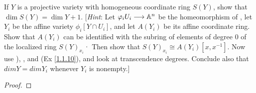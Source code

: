 \label{1.2.6}

If $Y$ is a projective variety with homogeneous coordinate ring $S(Y)$, show that
$\dim S(Y) = \dim Y + 1$. [\textit{Hint}: Let $\varphi_i U_i \longrightarrow \mathbb A^n$ be the homeomorphism of \cite[2.2]{hartshorne},
let $Y_i$ be the affine variety $\phi_i[Y \cap U_i]$, and let $A(Y_i)$ be its affine coordinate ring. Show that $A(Y_i)$ can be identified with the subring of elements of degree $0$ of the
localized ring $S(Y)_{x_i}$· Then show that $S(Y)_{x_i} \cong A(Y_i)[x, x^{-1}]$. Now use \cite[1.7]{hartshorne}),
\cite[1.8A]{hartshorne}, and (Ex \ref{1.1.10}), and look at transcendence degrees. Conclude also that $dim Y = dim Y_i$ whenever $Y_i$ is nonempty.]

\begin{proof}
    
\end{proof}